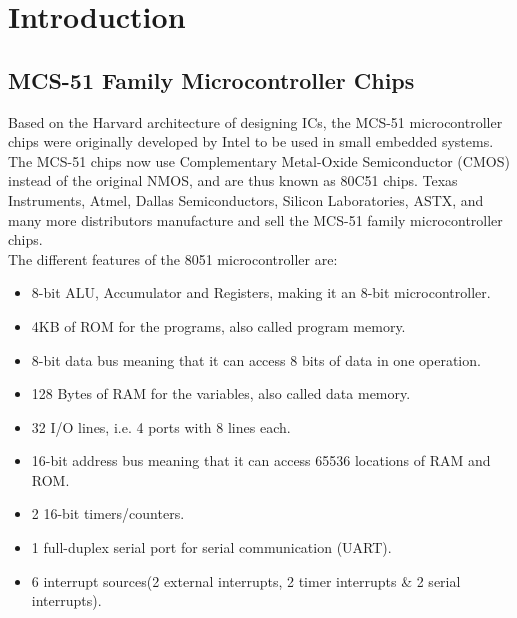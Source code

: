 \documentclass{lab_sheet}
\begin{document}
    \tableofcontents
    \pagebreak
    \listoffigures
    \pagebreak
    \listoftables
    \pagebreak
    \lstlistoflistings
    \pagebreak
    \section{Introduction}
    \subsection{MCS-51 Family Microcontroller Chips}
    Based on the Harvard architecture of designing ICs, the MCS-51 microcontroller chips were originally developed by Intel to be used in small embedded systems. The MCS-51 chips now use Complementary Metal-Oxide Semiconductor (CMOS) instead of the original NMOS, and are thus known as 80C51 chips. Texas Instruments, Atmel, Dallas Semiconductors, Silicon Laboratories, ASTX, and many more distributors manufacture and sell the MCS-51 family microcontroller chips.\\
    The different features of the 8051 microcontroller are: 
    \begin{itemize}
        \item 8-bit ALU, Accumulator and Registers, making it an 8-bit microcontroller.
        \item 4KB of ROM for the programs, also called program memory.
        \item 8-bit data bus meaning that it can access 8 bits of data in one operation.
        \item 128 Bytes of RAM for the variables, also called data memory.
        \item 32 I/O lines, i.e. 4 ports with 8 lines each.
        \item 16-bit address bus meaning that it can access 65536 locations of RAM and ROM.
        \item 2 16-bit timers/counters.
        \item 1 full-duplex serial port for serial communication (UART).
        \item 6 interrupt sources(2 external interrupts, 2 timer interrupts \& 2 serial interrupts).
        \end{itemize}
\end{document}
